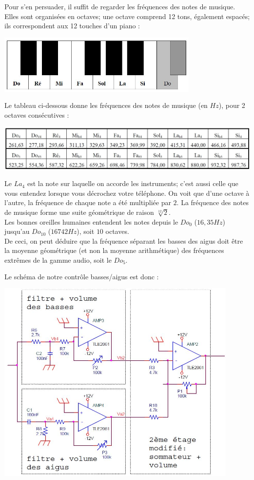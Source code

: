 \documentclass{../template/labo}
\begin{document}
Pour s'en persuader, il suffit de regarder les fréquences des notes de musique.
Elles sont organisées en octaves; une octave comprend 12 tons, également espacés; ils correspondent aux 12 touches d'un piano :
\begin{center}
\includegraphics[width=10cm]{figures/AOPpiano}
\end{center}

Le tableau ci-dessous donne les fréquences des notes de musique (en $Hz$), pour 2 octaves consécutives :
\begin{center}
\includegraphics[width=16cm]{figures/AOPpianotable}
\end{center}

Le $La_4$ est la note sur laquelle on accorde les instruments; c'est aussi celle que vous entendez lorsque vous décrochez votre téléphone. On voit que d'une octave à l'autre, la fréquence de chaque note a été multipliée par $2$. La fréquence des notes de musique forme une suite géométrique de raison $\sqrt[12]{2}$.\\
Les bonnes oreilles humaines entendent les notes depuis le $Do_0$ ($16,35Hz$) jusqu'au $Do_{10}$ ($16742Hz$), soit $10$ octaves.\\
De ceci, on peut déduire que la fréquence séparant les basses des aigus doit être la moyenne géométrique (et non la moyenne arithmétique) des fréquences extrêmes de la gamme audio, soit le $Do_5$.

Le schéma de notre contrôle basses/aigus est donc :
\begin{center}
\includegraphics[width=12cm]{figures/AOPfiltres}
\end{center}
\end{document}

